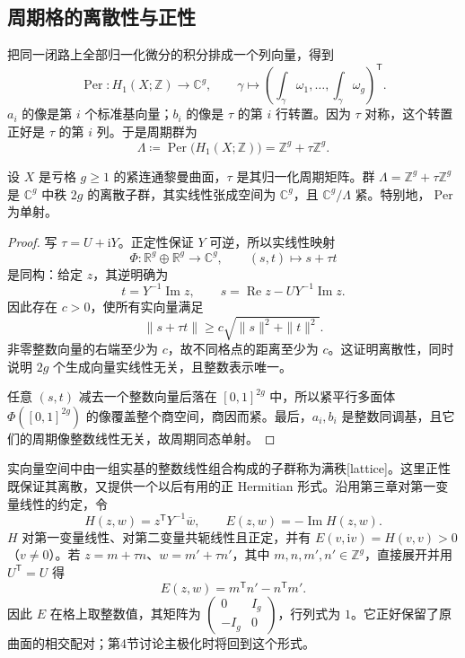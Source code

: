 \subsection{周期格的离散性与正性}
\label{g4:subsec:0401:04}

把同一闭路上全部归一化微分的积分排成一个列向量，得到
\[
	\operatorname{Per}:H_1(X;\mathbb Z)\longrightarrow\mathbb C^g,
	\qquad \gamma\longmapsto
	\left(\int_\gamma\omega_1,\ldots,\int_\gamma\omega_g\right)^{\mathsf T}.
\]
\(a_i\) 的像是第 \(i\) 个标准基向量；\(b_i\) 的像是 \(\tau\) 的第 \(i\) 行转置。因为 \(\tau\) 对称，这个转置正好是 \(\tau\) 的第 \(i\) 列。于是周期群为
\begin{equation}\label{g4:eq:0401:period-lattice}
	\Lambda\coloneqq\operatorname{Per}\bigl(H_1(X;\mathbb Z)\bigr)
	=\mathbb Z^g+\tau\mathbb Z^g.
\end{equation}

\begin{proposition}
	\label{g4:prop:0401:period-lattice}
	设 \(X\) 是亏格 \(g\ge1\) 的紧连通黎曼曲面，\(\tau\) 是其归一化周期矩阵。群 \(\Lambda=\mathbb Z^g+\tau\mathbb Z^g\) 是 \(\mathbb C^g\) 中秩 \(2g\) 的离散子群，其实线性张成空间为 \(\mathbb C^g\)，且 \(\mathbb C^g/\Lambda\) 紧。特别地，\(\operatorname{Per}\) 为单射。
\end{proposition}
\begin{proof}
	写 \(\tau=U+\mathrm{i}Y\)。正定性保证 \(Y\) 可逆，所以实线性映射
	\[
		\Phi:\mathbb R^g\oplus\mathbb R^g\longrightarrow\mathbb C^g,
		\qquad(s,t)\longmapsto s+\tau t
	\]
	是同构：给定 \(z\)，其逆明确为
	\[
		t=Y^{-1}\operatorname{Im}z,
		\qquad s=\operatorname{Re}z-UY^{-1}\operatorname{Im}z.
	\]
	因此存在 \(c>0\)，使所有实向量满足
	\[
		\|s+\tau t\|\ge c\sqrt{\|s\|^2+\|t\|^2}.
	\]
	非零整数向量的右端至少为 \(c\)，故不同格点的距离至少为 \(c\)。这证明离散性，同时说明 \(2g\) 个生成向量实线性无关，且整数表示唯一。

	任意 \((s,t)\) 减去一个整数向量后落在 \([0,1]^{2g}\) 中，所以紧平行多面体 \(\Phi([0,1]^{2g})\) 的像覆盖整个商空间，商因而紧。最后，\(a_i,b_i\) 是整数同调基，且它们的周期像整数线性无关，故周期同态单射。
\end{proof}

实向量空间中由一组实基的整数线性组合构成的子群称为满秩[lattice]。这里正性既保证其离散，又提供一个以后有用的正 Hermitian 形式。沿用第三章对第一变量线性的约定，令
\begin{equation}\label{g4:eq:0401:polarization-form}
	H(z,w)=z^{\mathsf T}Y^{-1}\overline w,
	\qquad E(z,w)=-\operatorname{Im}H(z,w).
\end{equation}
\(H\) 对第一变量线性、对第二变量共轭线性且正定，并有 \(E(v,\mathrm{i}v)=H(v,v)>0\)（\(v\ne0\)）。若 \(z=m+\tau n\)、\(w=m'+\tau n'\)，其中 \(m,n,m',n'\in\mathbb Z^g\)，直接展开并用 \(U^{\mathsf T}=U\) 得
\begin{equation}\label{g4:eq:0401:integral-alternating-form}
	E(z,w)=m^{\mathsf T}n'-n^{\mathsf T}m'.
\end{equation}
因此 \(E\) 在格上取整数值，其矩阵为 \(\left(\begin{smallmatrix}0&I_g\\-I_g&0\end{smallmatrix}\right)\)，行列式为 \(1\)。它正好保留了原曲面的相交配对；第4节讨论主极化时将回到这个形式。


